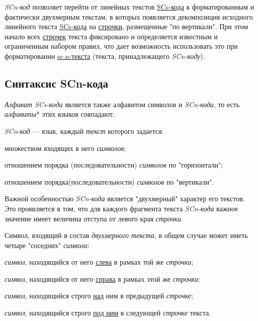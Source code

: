 \textit{SCn-код} позволяет перейти от линейных текстов \uline{SCs-кода} к форматированным и фактически двухмерным текстам, в которых появляется декомпозиция исходного линейного текста \uline{SCs-кода} на \uline{строчки}, размещенные "по вертикали"{}. При этом начало всех \uline{строчек} текста фиксировано и определяется известным и ограниченным набором правил, что дает возможность использовать это при форматировании \uline{sc.n-текста} (текста, принадлежащего \textit{SCn-коду}).

\subsection{Синтаксис SCn-кода}
\label{sec_scn_syntax}

\textit{Алфавит SCs-кода\scnsupergroupsign} является также алфавитом символов и \textit{SCn-кода}, то есть \textit{алфавиты}* этих языков совпадают.

\textit{SCn-код} --- язык, каждый \textit{текст} которого задается:
\begin{textitemize}
	\item множеством входящих в него \textit{символов};
	\item отношением порядка (последовательности) \textit{символов} по "горизонтали"{};
	\item отношением порядка(последовательности) \textit{символов} по "вертикали"{}.
\end{textitemize}

\begin{SCn}
\end{SCn}

Важной особенностью \textit{SCn-кода} является "двухмерный"{} характер его текстов. Это проявляется в том, что для каждого фрагмента текста \textit{SCn-кода} важное значение имеет величина отступа от левого края \textit{строчки}.

Символ, входящий в состав \textit{двухмерного текста}, в общем случае может иметь четыре "соседних"{} \textit{символа}: 
\begin{textitemize}
	\item \textit{символ}, находящийся от него \uline{слева} в рамках той же \textit{строчки};
	\item \textit{символ}, находящийся от него \uline{справа} в рамках этой же \textit{строчки};
	\item \textit{символ}, находящийся строго \uline{над} ним в предыдущей \textit{строчке};
	\item \textit{символ}, находящийся строго \uline{под ним} в следующей \textit{строчке} текста.
\end{textitemize}

